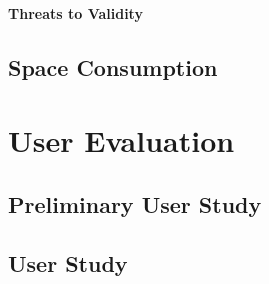 \paragraph{Threats to Validity}

\subsection{Space Consumption}
\label{s:space-consumption}

\section{User Evaluation}
\subsection{Preliminary User Study}
\subsection{User Study}